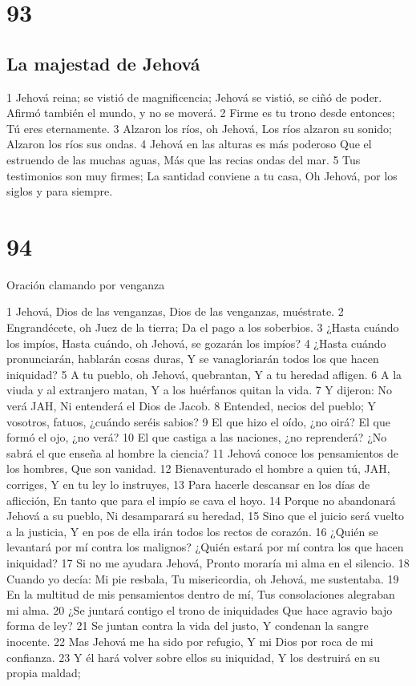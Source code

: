 \chapter{93}

\section*{La majestad de Jehová}

1 Jehová reina; se vistió de magnificencia;
Jehová se vistió, se ciñó de poder.
Afirmó también el mundo, y no se moverá.
2 Firme es tu trono desde entonces;
Tú eres eternamente.
3 Alzaron los ríos, oh Jehová,
Los ríos alzaron su sonido;
Alzaron los ríos sus ondas.
4 Jehová en las alturas es más poderoso
Que el estruendo de las muchas aguas,
Más que las recias ondas del mar.
5 Tus testimonios son muy firmes;
La santidad conviene a tu casa,
Oh Jehová, por los siglos y para siempre.

\chapter{94}

Oración clamando por venganza

1 Jehová, Dios de las venganzas,
Dios de las venganzas, muéstrate.
2 Engrandécete, oh Juez de la tierra;
Da el pago a los soberbios.
3 ¿Hasta cuándo los impíos,
Hasta cuándo, oh Jehová, se gozarán los impíos?
4 ¿Hasta cuándo pronunciarán, hablarán cosas duras,
Y se vanagloriarán todos los que hacen iniquidad?
5 A tu pueblo, oh Jehová, quebrantan,
Y a tu heredad afligen.
6 A la viuda y al extranjero matan,
Y a los huérfanos quitan la vida.
7 Y dijeron: No verá JAH,
Ni entenderá el Dios de Jacob.
8 Entended, necios del pueblo;
Y vosotros, fatuos, ¿cuándo seréis sabios?
9 El que hizo el oído, ¿no oirá?
El que formó el ojo, ¿no verá?
10 El que castiga a las naciones, ¿no reprenderá?
¿No sabrá el que enseña al hombre la ciencia?
11 Jehová conoce los pensamientos de los hombres,
Que son vanidad.
12 Bienaventurado el hombre a quien tú, JAH, corriges,
Y en tu ley lo instruyes,
13 Para hacerle descansar en los días de aflicción,
En tanto que para el impío se cava el hoyo.
14 Porque no abandonará Jehová a su pueblo,
Ni desamparará su heredad,
15 Sino que el juicio será vuelto a la justicia,
Y en pos de ella irán todos los rectos de corazón.
16 ¿Quién se levantará por mí contra los malignos?
¿Quién estará por mí contra los que hacen iniquidad?
17 Si no me ayudara Jehová,
Pronto moraría mi alma en el silencio.
18 Cuando yo decía: Mi pie resbala,
Tu misericordia, oh Jehová, me sustentaba.
19 En la multitud de mis pensamientos dentro de mí,
Tus consolaciones alegraban mi alma.
20 ¿Se juntará contigo el trono de iniquidades
Que hace agravio bajo forma de ley?
21 Se juntan contra la vida del justo,
Y condenan la sangre inocente.
22 Mas Jehová me ha sido por refugio,
Y mi Dios por roca de mi confianza.
23 Y él hará volver sobre ellos su iniquidad,
Y los destruirá en su propia maldad;
